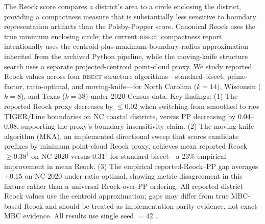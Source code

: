 The Reock score compares a district's area to a circle enclosing the district,
providing a compactness measure that is substantially less sensitive to boundary
representation artifacts than the Polsby-Popper score.
Canonical Reock uses the true minimum enclosing circle; the current
\textsc{bisect} compactness report intentionally uses the
centroid-plus-maximum-boundary-radius approximation inherited from the archived
Python pipeline, while the moving-knife structure search uses a separate
projected-centroid point-cloud proxy.
We study reported Reock values across four \textsc{bisect} structure algorithms---standard-bisect,
prime-factor, ratio-optimal, and moving-knife---for North Carolina ($k=14$),
Wisconsin ($k=8$), and Texas ($k=38$) under 2020 Census data.
Key findings: (1) The reported Reock proxy decreases by $\leq 0.02$ when switching from smoothed to
raw TIGER/Line boundaries on NC coastal districts, versus PP decreasing by
$0.04$--$0.08$, supporting the proxy's boundary-insensitivity claim.
(2) The moving-knife algorithm (MKA), an implemented directional sweep that
scores candidate prefixes by minimum point-cloud Reock proxy, achieves mean reported
Reock $\geq 0.38^\dagger$ on NC 2020 versus $0.31^\dagger$ for standard-bisect---a
23\% empirical improvement in mean Reock.
(3) The empirical reported-Reock--PP gap averages $+0.15$ on NC 2020 under
ratio-optimal, showing metric disagreement in this fixture rather than a
universal Reock-over-PP ordering.
All reported district Reock values use the centroid approximation; gaps may
differ from true MBC-based Reock and should be treated as implementation-parity
evidence, not exact-MBC evidence.
All results use single seed $= 42^\dagger$.
